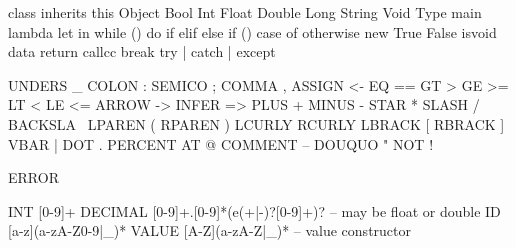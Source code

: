 class inherits this
Object
Bool
Int
Float
Double
Long
String
Void
Type
main
lambda
let in
while () { } do
if elif else
if () { }
case of
otherwise
new
True
False
isvoid
data
return
callcc
break
try | catch | except

UNDERS  _
COLON   :
SEMICO  ;
COMMA   ,
ASSIGN  <-
EQ      ==
GT      >
GE      >=
LT      <
LE      <=
ARROW   ->
INFER   =>
PLUS    +
MINUS   -
STAR    *
SLASH   /
BACKSLA \
LPAREN  (
RPAREN  )
LCURLY  {
RCURLY  }
LBRACK  [
RBRACK  ]
VBAR    |
DOT     .
PERCENT %
AT      @
COMMENT --
DOUQUO  "
NOT     !

ERROR


INT     [0-9]+
DECIMAL [0-9]+.[0-9]*(e(+|-)?[0-9]+)?   -- may be float or double
ID      [a-z](a-zA-Z0-9|_)*
VALUE   [A-Z](a-zA-Z|_)*  -- value constructor

